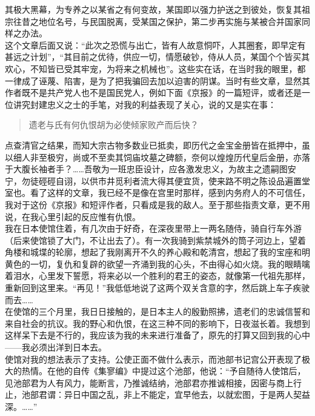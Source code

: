 其极大黑幕，为专养之以某省之有何变故，某国即以强力护送之到彼处，恢复其祖宗往昔之地位名号，与民国脱离，受某国之保护，第二步再实施与某被合并国家同样之办法。\\

这个文章后面又说：“此次之恐慌与出亡，皆有人故意恫吓，人其圈套，即早定有甚远之计划”，“其目前之优待，供应一切，情愿破钞，侍从人员，某国个个皆买其欢心，不知皆已受其牢宠，为将来之机械也”。这些实在话，在当时我的眼里，都一律成了诬蔑、陷害，是为了把我骗回去加以迫害的阴谋。当时有些文章，显然其作者既不是共产党人也不是国民党人，例如下面《京报》的一篇短评，或者还是一位讲究封建忠义之士的手笔，对我的利益表现了关心，说的又是实在事：\\

\begin{quote}
	遗老与氏有何仇恨胡为必使倾家败产而后快？\\
\end{quote}

点查清官之结果，而知大宗古物多数业已抵卖，即历代之金宝金册皆在抵押中，虽以细人非至极穷，尚或不至卖其饲庙坟墓之碑额，奈何以煌煌历代皇后金册，亦落于大腹长袖者手？……吾敬为一班忠臣设计，应各激发忠义，为故主之遗嗣图安宁，勿徒硜硜自诩，以供市井觅利者流大得其便宜货，使来路不明之陈设品遍置堂室也。看了这样的文章，我已经不是像在宫里时那样，感到内务府人的不可信任，我对于这份《京报》和短评作者，只看成是我的敌人。至于那些指责文章，更不用说，在我心里引起的反应惟有仇恨。\\

我在日本使馆住着，有几次由于好奇，在深夜里带上一两名随侍，骑自行车外游（后来使馆锁了大门，不让出去了）。有一次我骑到紫禁城外的筒子河边上，望着角楼和城堞的轮廓，想起了我刚离开不久的养心殿和乾清宫，想起了我的宝座和明黄色的一切，复仇和复辟的欲望一齐涌到我的心头，不由得心如火烧。我的眼睛噙着泪水，心里发下誓愿，将来必以一个胜利的君王的姿态，就像第一代祖先那样，重新回到这里来。“再见！”我低低地说了这两个双关含意的字，然后跳上车子疾驶而去……\\

在使馆的三个月里，我日日接触的，是日本主人的殷勤照拂，遗老们的忠诚信誓和来自社会的抗议。我的野心和仇恨，在这三种不同的影响下，日夜滋长着。我想到这样呆下去是不行的，我应该为我的未来进行准备了，原先的打算又回到我的心中——我必须出洋到日本去。\\

使馆对我的想法表示了支持。公使正面不做什么表示，而池部书记宫公开表现了极大的热情。在他的自传《集寥编》中提过这个池部，他说：“予自随待人使馆后，见池部君为人有风力，能断言，乃推诚结纳，池部君亦推诚相接，因密与商上行止，池部君谓：异日中国之乱，非上不能定，宜早他去，以就宏图，于是两人契益深。……”\\

